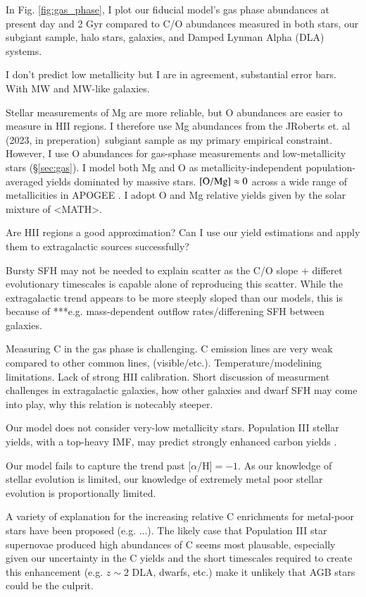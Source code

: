 \documentclass[12pt,oneside]{report}
\newcommand{\citetjack}{JRoberts et. al (2023, in preperation)}
\begin{document}
In Fig. \ref{fig:gas_phase}, I plot our fiducial model's gas phase abundances
at present day and 2 Gyr compared to C/O
abundances measured in both stars, our subgiant sample, halo stars, galaxies,
and Damped Lynman Alpha (DLA) systems. 

I don't predict low metallicity but I are in agreement, substantial error bars.
With MW and MW-like galaxies.


Stellar measurements of Mg are more reliable, but O abundances are easier to measure in HII regions.  I therefore use Mg abundances from the \citetjack~subgiant sample as my primary empirical constraint. However, I use O abundances for gas-sphase measurements and low-metallicity stars (\S \ref{sec:gas}). I model both Mg and O as metallicity-independent population-averaged yields dominated by massive stars. ${\rm [O/Mg]}\approx 0$ across a wide range of metallicities in APOGEE \citep{Weinberg+19, Weinberg+22}. 
I adopt O and Mg relative yields given by the solar mixture of \cite{asplund+09} <MATH>.



Are HII regions a good approximation?
Can I use our yield estimations and apply them to extragalactic sources successfully? 

Bursty SFH may not be needed to explain scatter as the C/O slope + differet evolutionary timescales is capable alone of reproducing this scatter.
While the extragalactic trend appears to be more steeply sloped than our models, this is because of ***e.g. mass-dependent outflow rates/differening SFH between galaxies. 

Measuring C in the gas phase is challenging. C emission lines are
very weak compared to other common lines, (visible/etc.).
Temperature/modelining limitations. Lack of strong HII calibration. 
Short discussion of measurment challenges in extragalactic galaxies, how other galaxies and dwarf SFH may come into play, why this relation is notecably steeper.

Our model does not consider very-low metallicity stars. Population III stellar yields, with a top-heavy IMF, may predict strongly enhanced carbon yields \cite[e.g.]{hirschi07}.


Our model fails to capture the trend past [$\alpha$/H]$=-1$. As our knowledge
of stellar evolution is limited, our knowledge of extremely metal poor stellar
evolution is proportionally limited. 

A variety of explanation for the increasing relative C
enrichments for metal-poor stars have been proposed (e.g. ...). The likely case
that Population III star supernovae produced high abundances of C seems
most plausable, especially given our uncertainty in the C yields and the
short timescales required to create this enhancement (e.g. $z\sim 2$ DLA,
dwarfs, etc.) make it unlikely that AGB stars could be the culprit. 
\end{document}
